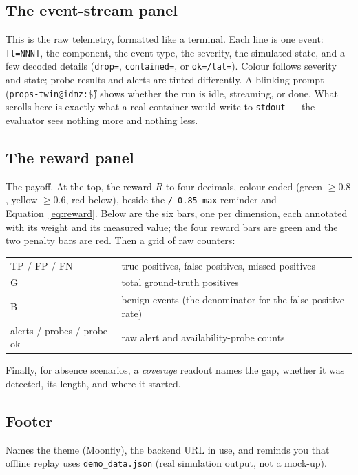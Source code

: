 \documentclass[11pt]{article}
\newcommand{\code}[1]{\texttt{\small #1}}
\begin{document}
\subsection{The event-stream panel}
This is the raw telemetry, formatted like a terminal. Each line is one event:
\code{[t=NNN]}, the component, the event type, the severity, the simulated state,
and a few decoded details (\code{drop=}, \code{contained=}, or \code{ok=/lat=}).
Colour follows severity and state; probe results and alerts are tinted
differently. A blinking prompt (\code{props-twin@idmz:\~\$}) shows whether the run
is idle, streaming, or done. What scrolls here is exactly what a real container
would write to \code{stdout} --- the evaluator sees nothing more and nothing less.

\subsection{The reward panel}
The payoff. At the top, the reward $R$ to four decimals, colour-coded
(green $\ge 0.8$, yellow $\ge 0.6$, red below), beside the \code{/ 0.85 max}
reminder and Equation~\eqref{eq:reward}. Below are the six bars, one per
dimension, each annotated with its weight and its measured value; the four reward
bars are green and the two penalty bars are red. Then a grid of raw counters:
\begin{center}\small
\begin{tabular}{l >{\RaggedRight\arraybackslash}p{8cm}}
TP / FP / FN & true positives, false positives, missed positives\\
G & total ground-truth positives\\
B & benign events (the denominator for the false-positive rate)\\
alerts / probes / probe ok & raw alert and availability-probe counts\\
\end{tabular}
\end{center}
Finally, for absence scenarios, a \emph{coverage} readout names the gap, whether
it was detected, its length, and where it started.

\subsection{Footer}
Names the theme (Moonfly), the backend URL in use, and reminds you that offline
replay uses \code{demo\_data.json} (real simulation output, not a mock-up).

\end{document}
